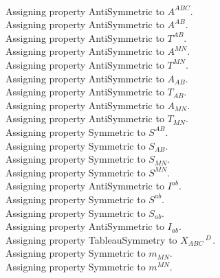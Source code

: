 \documentclass[11pt]{article}
\begin{document}
\\
Assigning property AntiSymmetric to ${A}^{A B C}$.
\\
Assigning property AntiSymmetric to ${A}^{A B}$.
\\
Assigning property AntiSymmetric to ${T}^{A B}$.
\\
Assigning property AntiSymmetric to ${A}^{M N}$.
\\
Assigning property AntiSymmetric to ${T}^{M N}$.
\\
Assigning property AntiSymmetric to ${A}_{A B}$.
\\
Assigning property AntiSymmetric to ${T}_{A B}$.
\\
Assigning property AntiSymmetric to ${A}_{M N}$.
\\
Assigning property AntiSymmetric to ${T}_{M N}$.
\\
Assigning property Symmetric to ${S}^{A B}$.
\\
Assigning property Symmetric to ${S}_{A B}$.
\\
Assigning property Symmetric to ${S}_{M N}$.
\\
Assigning property Symmetric to ${S}^{M N}$.
\\
Assigning property AntiSymmetric to ${I}^{a b}$.
\\
Assigning property Symmetric to ${S}^{a b}$.
\\
Assigning property Symmetric to ${S}_{a b}$.
\\
Assigning property AntiSymmetric to ${I}_{a b}$.
\\
Assigning property TableauSymmetry to ${X}_{A B C}\,^{D\, }$.
\\
Assigning property Symmetric to ${m}_{M N}$.
\\
Assigning property Symmetric to ${m}^{M N}$.
\\
\end{document}
